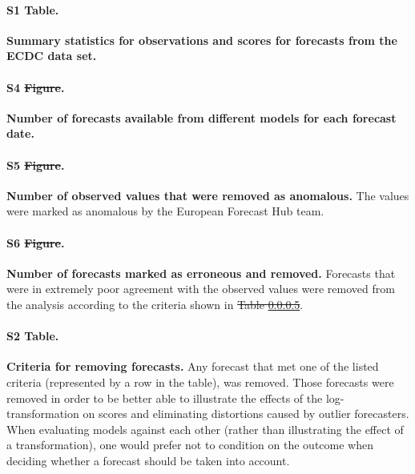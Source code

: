 \documentclass[10pt,letterpaper]{article} %
\providecommand{\DIFaddtex}[1]{{\protect\color{blue}\uwave{#1}}} %
\providecommand{\DIFdeltex}[1]{{\protect\color{red}\sout{#1}}}                      %
\providecommand{\DIFaddbegin}{} %
\providecommand{\DIFaddend}{} %
\providecommand{\DIFdelbegin}{} %
\providecommand{\DIFdelend}{} %
\providecommand{\DIFadd}[1]{\texorpdfstring{\DIFaddtex{#1}}{#1}} %
\providecommand{\DIFdel}[1]{\texorpdfstring{\DIFdeltex{#1}}{}} %
\newcommand{\DIFscaledelfig}{0.5}
\newlength{\DIFdelgraphicswidth} %
\newlength{\DIFdelgraphicsheight} %
\newcommand{\DIFaddincludegraphics}[2][]{{\color{blue}\fbox{\DIFOincludegraphics[#1]{#2}}}} %
\newcommand{\DIFdelincludegraphics}[2][]{%
\sbox{\DIFdelgraphicsbox}{\DIFOincludegraphics[#1]{#2}}%
\settoboxwidth{\DIFdelgraphicswidth}{\DIFdelgraphicsbox} %
\settoboxtotalheight{\DIFdelgraphicsheight}{\DIFdelgraphicsbox} %
\scalebox{\DIFscaledelfig}{%
\parbox[b]{\DIFdelgraphicswidth}{\usebox{\DIFdelgraphicsbox}\\[-\baselineskip] \rule{\DIFdelgraphicswidth}{0em}}\llap{\resizebox{\DIFdelgraphicswidth}{\DIFdelgraphicsheight}{%
\setlength{\unitlength}{\DIFdelgraphicswidth}%
\begin{picture}(1,1)%
\thicklines\linethickness{2pt} %
{\color[rgb]{1,0,0}\put(0,0){\framebox(1,1){}}}%
{\color[rgb]{1,0,0}\put(0,0){\line( 1,1){1}}}%
{\color[rgb]{1,0,0}\put(0,1){\line(1,-1){1}}}%
\end{picture}%
}\hspace*{3pt}}} %
} %
\DeclareRobustCommand{\DIFaddbegin}{\DIFOaddbegin \let\includegraphics\DIFaddincludegraphics} %
\DeclareRobustCommand{\DIFaddend}{\DIFOaddend \let\includegraphics\DIFOincludegraphics} %
\DeclareRobustCommand{\DIFdelbegin}{\DIFOdelbegin \let\includegraphics\DIFdelincludegraphics} %
\DeclareRobustCommand{\DIFdelend}{\DIFOaddend \let\includegraphics\DIFOincludegraphics} %
\begin{document}
\paragraph{S1 Table.}
\label{tab:HUB-summary}
\textbf{Summary statistics for observations and scores for forecasts from the ECDC data set.}

\paragraph{S4 \DIFdelbegin \DIFdel{Figure}\DIFdelend \DIFaddbegin \DIFadd{Fig}\DIFaddend .}
\label{fig:HUB-num-avail-models}
\textbf{Number of forecasts available from different models for each forecast date.}

\paragraph{S5 \DIFdelbegin \DIFdel{Figure}\DIFdelend \DIFaddbegin \DIFadd{Fig}\DIFaddend .}
\label{fig:number-anomalies}
\textbf{Number of observed values that were removed as anomalous. }
The values were marked as anomalous by the European Forecast Hub team. 

\paragraph{S6 \DIFdelbegin \DIFdel{Figure}\DIFdelend \DIFaddbegin \DIFadd{Fig}\DIFaddend .}
\label{fig:erroneous-forecasts}
\textbf{Number of forecasts marked as erroneous and removed. } 
Forecasts that were in extremely poor agreement with the observed values were removed from the analysis according to the criteria shown in \DIFdelbegin \DIFdel{Table \ref{tab:erroneous}}\DIFdelend \DIFaddbegin {}\DIFaddend . 

\paragraph{S2 Table.}
\label{tab:erroneous}
\textbf{Criteria for removing forecasts. }
Any forecast that met one of the listed criteria (represented by a row in the table), was removed. Those forecasts were removed in order to be better able to illustrate the effects of the log-transformation on scores and eliminating distortions caused by outlier forecasters. When evaluating models against each other (rather than illustrating the effect of a transformation), one would prefer not to condition on the outcome when deciding whether a forecast should be taken into account. 
\end{document}
